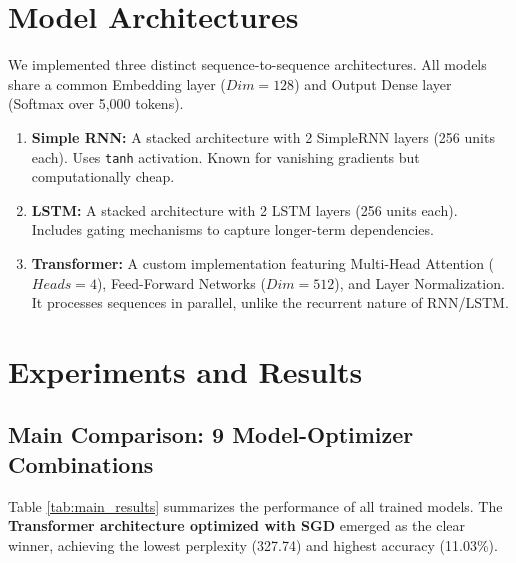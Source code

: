 \documentclass[12pt,a4paper]{article}
\begin{document}
\section{Model Architectures}

We implemented three distinct sequence-to-sequence architectures. All models share a common Embedding layer ($Dim=128$) and Output Dense layer (Softmax over 5,000 tokens).

\begin{enumerate}
    \item \textbf{Simple RNN:} A stacked architecture with 2 SimpleRNN layers (256 units each). Uses \texttt{tanh} activation. Known for vanishing gradients but computationally cheap.
    \item \textbf{LSTM:} A stacked architecture with 2 LSTM layers (256 units each). Includes gating mechanisms to capture longer-term dependencies.
    \item \textbf{Transformer:} A custom implementation featuring Multi-Head Attention ($Heads=4$), Feed-Forward Networks ($Dim=512$), and Layer Normalization. It processes sequences in parallel, unlike the recurrent nature of RNN/LSTM.
\end{enumerate}

\section{Experiments and Results}

\subsection{Main Comparison: 9 Model-Optimizer Combinations}
Table \ref{tab:main_results} summarizes the performance of all trained models. The \textbf{Transformer architecture optimized with SGD} emerged as the clear winner, achieving the lowest perplexity (327.74) and highest accuracy (11.03\%).
\end{document}
